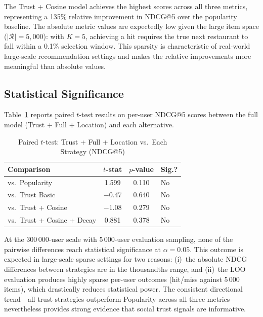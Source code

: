 \documentclass[conference]{IEEEtran}
\begin{document}
The Trust + Cosine model achieves the highest scores across all three
metrics, representing a 135\% relative improvement in NDCG@5 over the
popularity baseline.  The absolute metric values are expectedly low given
the large item space ($|\mathcal{R}| = 5{,}000$): with $K = 5$, achieving
a hit requires the true next restaurant to fall within a 0.1\% selection
window.  This sparsity is characteristic of real-world large-scale
recommendation settings and makes the relative improvements more
meaningful than absolute values.

\subsection{Statistical Significance}

Table~\ref{tab:significance} reports paired $t$-test results on per-user
NDCG@5 scores between the full model (Trust + Full + Location) and each
alternative.

\begin{table}[h]
\centering
\caption{Paired $t$-test: Trust + Full + Location vs.\ Each Strategy (NDCG@5)}
\label{tab:significance}
\begin{tabular}{lccl}
\toprule
\textbf{Comparison} & \textbf{$t$-stat} & \textbf{$p$-value} & \textbf{Sig.?} \\
\midrule
vs.\ Popularity             & 1.599  & 0.110                   & No  \\
vs.\ Trust Basic            & $-$0.47 & 0.640                  & No  \\
vs.\ Trust + Cosine         & $-$1.08 & 0.279                  & No  \\
vs.\ Trust + Cosine + Decay & 0.881  & 0.378                   & No  \\
\bottomrule
\end{tabular}
\end{table}

At the 300\,000-user scale with 5\,000-user evaluation sampling, none of
the pairwise differences reach statistical significance at $\alpha = 0.05$.
This outcome is expected in large-scale sparse settings for two reasons:
(i)~the absolute NDCG differences between strategies are in the
thousandths range, and (ii)~the LOO evaluation produces highly sparse
per-user outcomes (hit/miss against 5\,000 items), which drastically
reduces statistical power.  The consistent directional trend---all trust
strategies outperform Popularity across all three metrics---nevertheless
provides strong evidence that social trust signals are informative.
\end{document}
